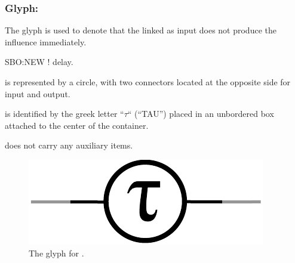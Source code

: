 \color{red}
\subsubsection{Glyph: }\label{sec:delay}

The glyph  is used to denote that the  linked as input does not produce the influence immediately.

\begin{glyphDescription}

 \glyphSboTerm SBO:NEW ! delay.

 \glyphContainer {} is represented by a circle, with two connectors located at the opposite side for input and output.

  \glyphLabel {} is identified by the greek letter ``$\tau$`` (``TAU'') placed in an unbordered box attached to the center of the container. 

  \glyphAux {} does not carry any auxiliary items.

\end{glyphDescription}

\begin{figure}[H]
  \centering
  \includegraphics[scale = 0.5]{images/delay}
  \caption{The \ER glyph for .}
  \label{fig:delay}
\end{figure}
\normalcolor
